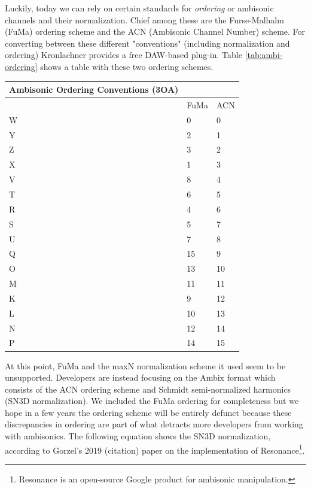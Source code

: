 Luckily, today we can rely on certain standards for \textit{ordering} or ambisonic channels and their normalization. Chief among these are the Furse-Malhalm (FuMa) ordering scheme and the ACN (Ambisonic Channel Number) scheme. For converting between these different "conventions" (including normalization and ordering) Kronlachner \cite{kronlachner2014plug} provides a free DAW-based plug-in. Table \ref{tab:ambi-ordering} shows a table with these two ordering schemes. 


\begin{center}
    \begin{tabular}{ | l | l | l | }
    \hline
	Ambisonic Ordering Conventions (3OA) &  &  \\ \hline
	 & FuMa & ACN \\ \hline
	W & 0 & 0 \\ \hline
	Y & 2 & 1 \\ \hline
	Z & 3 & 2 \\ \hline
	X & 1 & 3 \\ \hline
	V & 8 & 4 \\ \hline
	T & 6 & 5 \\ \hline
	R & 4 & 6 \\ \hline
	S & 5 & 7 \\ \hline
	U & 7 & 8 \\ \hline
	Q & 15 & 9 \\ \hline
	O & 13 & 10 \\ \hline
	M & 11 & 11 \\ \hline
	K & 9 & 12 \\ \hline
	L & 10 & 13 \\ \hline
	N & 12 & 14 \\ \hline
	P & 14 & 15 \\ \hline
    \end{tabular}
    \label{tab:ambi-ordering}
\end{center}

At this point, FuMa and the maxN normalization scheme it used seem to be unsupported. Developers are instead focusing on the Ambix format which consists of the ACN ordering scheme and Schmidt semi-normalized harmonics (SN3D normalization). We included the FuMa ordering for completeness but we hope in a few years the ordering scheme will be entirely defunct because these discrepancies in ordering are part of what detracts more developers from working with ambisonics. The following equation shows the SN3D normalization, according to Gorzel's 2019 (citation) paper on the implementation of Resonance\footnote{Resonance is an open-source Google product for ambisonic manipulation.}. 

